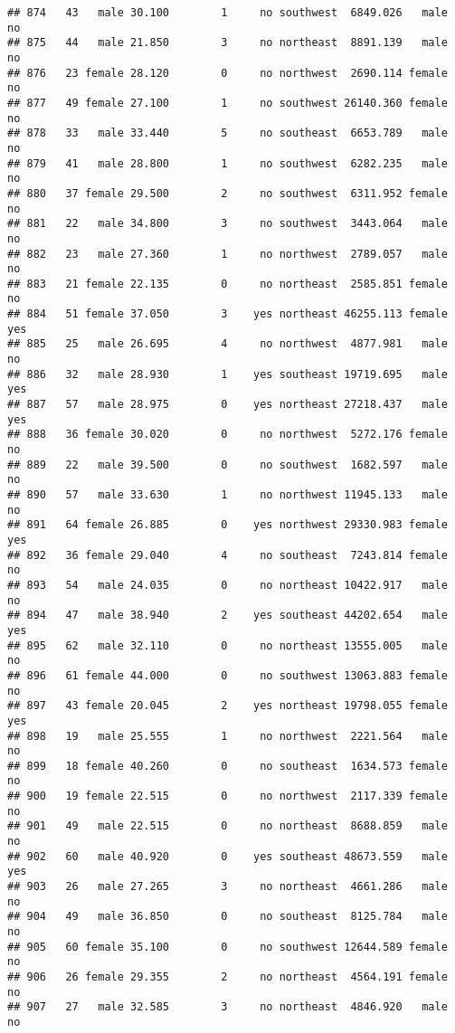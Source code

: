 \documentclass[
]{article}
\begin{document}
\begin{verbatim}
## 874   43   male 30.100        1     no southwest  6849.026   male       no
## 875   44   male 21.850        3     no northeast  8891.139   male       no
## 876   23 female 28.120        0     no northwest  2690.114 female       no
## 877   49 female 27.100        1     no southwest 26140.360 female       no
## 878   33   male 33.440        5     no southeast  6653.789   male       no
## 879   41   male 28.800        1     no southwest  6282.235   male       no
## 880   37 female 29.500        2     no southwest  6311.952 female       no
## 881   22   male 34.800        3     no southwest  3443.064   male       no
## 882   23   male 27.360        1     no northwest  2789.057   male       no
## 883   21 female 22.135        0     no northeast  2585.851 female       no
## 884   51 female 37.050        3    yes northeast 46255.113 female      yes
## 885   25   male 26.695        4     no northwest  4877.981   male       no
## 886   32   male 28.930        1    yes southeast 19719.695   male      yes
## 887   57   male 28.975        0    yes northeast 27218.437   male      yes
## 888   36 female 30.020        0     no northwest  5272.176 female       no
## 889   22   male 39.500        0     no southwest  1682.597   male       no
## 890   57   male 33.630        1     no northwest 11945.133   male       no
## 891   64 female 26.885        0    yes northwest 29330.983 female      yes
## 892   36 female 29.040        4     no southeast  7243.814 female       no
## 893   54   male 24.035        0     no northeast 10422.917   male       no
## 894   47   male 38.940        2    yes southeast 44202.654   male      yes
## 895   62   male 32.110        0     no northeast 13555.005   male       no
## 896   61 female 44.000        0     no southwest 13063.883 female       no
## 897   43 female 20.045        2    yes northeast 19798.055 female      yes
## 898   19   male 25.555        1     no northwest  2221.564   male       no
## 899   18 female 40.260        0     no southeast  1634.573 female       no
## 900   19 female 22.515        0     no northwest  2117.339 female       no
## 901   49   male 22.515        0     no northeast  8688.859   male       no
## 902   60   male 40.920        0    yes southeast 48673.559   male      yes
## 903   26   male 27.265        3     no northeast  4661.286   male       no
## 904   49   male 36.850        0     no southeast  8125.784   male       no
## 905   60 female 35.100        0     no southwest 12644.589 female       no
## 906   26 female 29.355        2     no northeast  4564.191 female       no
## 907   27   male 32.585        3     no northeast  4846.920   male       no

\end{verbatim}
\end{document}
